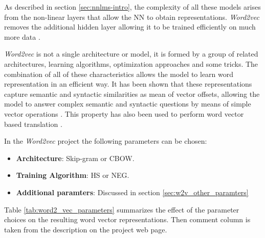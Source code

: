 As  described in section \ref{sec:nnlms-intro}, the complexity of all 
these models arises from the non-linear layers  that allow the \ac{NN} to
obtain  representations.  \textit{Word2vec} removes the additional
hidden layer  allowing it to be trained efficiently on much more data  \cite{DBLP:journals/corr/abs-1301-3781}.

\textit{Word2vec} is not a single architecture or model, it is formed by a
group of related architectures, learning algorithms, optimization 
approaches and some tricks. The combination of all of these characteristics
allows the model  to learn word representation in an efficient
way. It has been shown that these representations  capture semantic and
syntactic 
similarities as mean of vector offsets, allowing the model to answer complex
semantic and syntactic questions by means 
of simple vector operations   \cite{MikolovSCCD13}. This property  has also
been used to perform word vector based translation \cite{DBLP:journals/corr/MikolovLS13}.  

In the \textit{Word2vec} project the following parameters can be chosen:


\begin{itemize}
\item \textbf{Architecture}: Skip-gram or \ac{CBOW}.
\item \textbf{Training Algorithm}: \ac{HS}  or \ac{NEG}.
\item \textbf{Additional paramters}: Discussed in section \ref{sec:w2v_other_paramters}
\end{itemize}


Table \ref{tab:word2_vec_parameters} summarizes the effect of the parameter choices on the resulting word vector representations.  Then comment column is
taken from the description  on the project web page.


